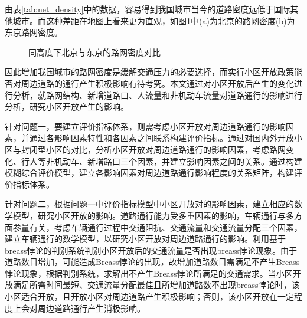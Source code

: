 \documentclass[fontset=windows,a4paper,12pt]{ctexart}
\begin{document}
  由表\ref{tab:net_density}中的数据，容易得到我国城市当今的道路密度远低于国际其他城市。而这种差距在地图上看来更为直观，如图\ref{fig:cmp_tokyo_beijing}中(a)为北京的路网密度(b)为东京路网密度。
  \begin{figure}[!htbp]
  	 \centering
	 \caption{同高度下北京与东京的路网密度对比}
	 \label{fig:cmp_tokyo_beijing}
  \end{figure}
  因此增加我国城市的路网密度是缓解交通压力的必要选择，而实行小区开放政策能否对周边道路的通行产生积极影响有待考究。本文通过对小区开放后产生的变化进行分析，就路网结构、新增道路口、人流量和非机动车流量对道路通行的影响进行分析，研究小区开放产生的影响。
  
	针对问题一，要建立评价指标体系，则需考虑小区开放对周边道路通行的影响因素，并通过各影响因素特性和各因素之间联系构建评价指标。通过对国内外开放小区与封闭型小区的对比，分析小区开放对周边道路通行的影响因素，考虑路网变化、行人等非机动车、新增路口三个因素，并建立影响因素之间的关系。通过构建模糊综合评价模型，建立各影响因素对周边道路通行影响程度的关系矩阵，构建评价指标体系。
	
	针对问题二，根据问题一中评价指标模型中小区开放对的影响因素，建立相应的数学模型，研究小区开放的影响。道路通行能力受多重因素的影响，车辆通行与多方面参量有关，考虑车辆通行过程中交通阻抗、交通流量和交通流量分配三个因素，建立车辆通行的数学模型，以研究小区开放对周边道路通行的影响。利用基于breass悖论的判别系统判别小区开放后的交通流量是否出现breass悖论现象。由于道路数目增加，可能造成Breass悖论的出现，故增加道路数目需满足不产生Breass悖论现象，根据判别系统，求解出不产生Breass悖论所满足的交通需求。当小区开放满足所需时间最短、交通流量分配最佳且所增加道路数不出现breass悖论时，该小区适合开放，且开放小区对周边道路产生积极影响；否则，该小区开放在一定程度上会对周边道路通行产生消极影响。  
	
\end{document}
